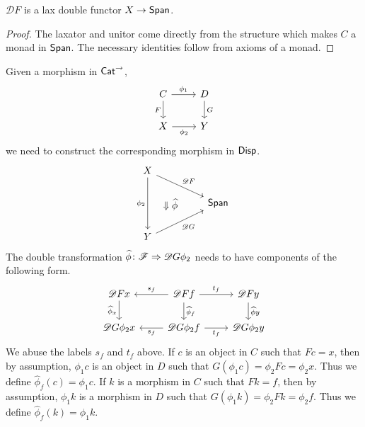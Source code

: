 \begin{lem}
    $\mathscr DF$ is a lax double functor $X \to \mathsf{Span}$.
\end{lem}
\begin{proof}
    The laxator and unitor come directly from the structure which makes $C$ a monad in $\mathsf{Span}$. The necessary identities follow from axioms of a monad.
\end{proof}

Given a morphism in $\mathsf{Cat}^\to$,
\[
\begin{tikzcd}
    C
    \arrow[d, swap, "F"]
    \arrow[r, "\phi_1"]
    &
    D
    \arrow[d, "G"]
    \\
    X
    \arrow[r, swap, "\phi_2"]
    &
    Y
\end{tikzcd}
\]
we need to construct the corresponding morphism in $\mathsf{Disp}$.
\[
\begin{tikzcd}
    X
    \arrow[dd, swap, "\phi_2"]
    \arrow[dd, phantom, "\Downarrow \widehat\phi", bend left = 60]
    \arrow[drr, "\mathscr DF"]
    \\&&
    \Span
    \\
    Y
    \arrow[urr, swap, "\mathscr DG"]
\end{tikzcd}
\]
The double transformation $\widehat \phi \colon \mathscr F \Rightarrow \mathscr DG \phi_2$ needs to have components of the following form.
\[
\begin{tikzcd}
    \mathscr DFx
    \arrow[d, swap, "\widehat \phi_x"]
    &
    \mathscr DFf
    \arrow[l, swap, "s_f"]
    \arrow[d, "\widehat \phi_f"]
    \arrow[r, "t_f"]
    &
    \mathscr DFy
    \arrow[d, "\widehat\phi y"]
    \\
    \mathscr DG\phi_2x
    &
    \mathscr DG\phi_2f
    \arrow[l, "s_f"]
    \arrow[r, swap, "t_f"]
    &
    \mathscr DG\phi_2y
\end{tikzcd}
\]
We abuse the labels $s_f$ and $t_f$ above. If $c$ is an object in $C$ such that $Fc = x$, then by assumption, $\phi_1c$ is an object in $D$ such that $G(\phi_1c) = \phi_2Fc = \phi_2x$. Thus we define $\widehat \phi_f (c) = \phi_1c$. If $k$ is a morphism in $C$ such that $Fk = f$, then by assumption, $\phi_1k$ is a morphism in $D$ such that $G(\phi_1k) = \phi_2Fk = \phi_2f$. Thus we define $\widehat \phi_f (k) = \phi_1k$. 

